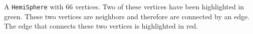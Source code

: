 \label{fig:hemiSphereFig} A \verb|HemiSphere| with 66 vertices. Two of these vertices have been highlighted in green. These two vertices are neighbors and therefore are connected by an edge. The edge that connects these two vertices is highlighted in red.
